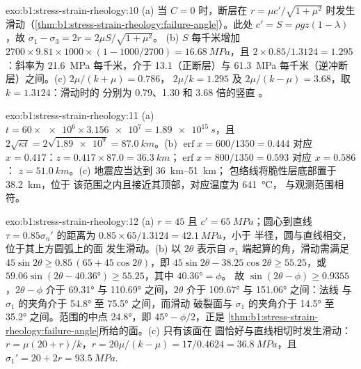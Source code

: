 \begin{solution}{exo:b1:stress-strain-rheology:10}
(a) 当 $C = 0$ 时，断层在 $r = \mu c'/\sqrt{1+\mu^2}$
时发生滑动（\cref{thm:b1:stress-strain-rheology:failure-angle}）。此处 $c' = S =
\rho g z(1-\lambda)$，故 $\sigma_1 - \sigma_3 = 2r = 2\mu S/\sqrt{1+\mu^2}$。
(b) $S$ 每千米增加 $2700\times9.81\times1000\times(1 - 1000/2700) =
\qty{16.68}{MPa}$，且 $2\times0.85/1.3124 = 1.295$：斜率为
\qty{21.6}{MPa} 每千米，介于 \num{13.1}（正断层）与
\qty{61.3}{MPa} 每千米（逆冲断层）之间。(c) $2\mu/(k+\mu) = 0.786$，
$2\mu/k = 1.295$ 及 $2\mu/(k-\mu) = 3.68$，取 $k = 1.3124$：滑动时的
分别为 0.79、1.30 和 3.68 倍的竖直
。
\end{solution}

\begin{solution}{exo:b1:stress-strain-rheology:11}
(a) $t = 60\times\num{e6}\times\num{3.156e7} = \qty{1.89e15}{s}$，且
$2\sqrt{\kappa t} = 2\sqrt{\num{1.89e9}} = \qty{87.0}{km}$。(b)
$\operatorname{erf}x = 600/1350 = 0.444$ 对应 $x = 0.417$：$z = 0.417\times87.0
= \qty{36.3}{km}$；$\operatorname{erf}x = 800/1350 = 0.593$ 对应 $x = 0.586$：
$z = \qty{51.0}{km}$。(c) 地震应当达到 \qtyrange{36}{51}{km}；
包络线将脆性层底部置于 \qty{38.2}{km}，位于
该范围之内且接近其顶部，对应温度为 \qty{641}{\degreeCelsius}，
与观测范围相符。
\end{solution}

\begin{solution}{exo:b1:stress-strain-rheology:12}
(a) $r = 45$ 且 $c' = \qty{65}{MPa}$；圆心到直线
$\tau = 0.85\sigma_n'$ 的距离为 $0.85\times65/1.3124 = \qty{42.1}{MPa}$，小于
半径，圆与直线相交，位于其上方圆弧上的面
发生滑动。(b) 以 $2\theta$ 表示自 $\sigma_1$ 端起算的角，滑动需满足
$45\sin2\theta \ge 0.85\,(65 + 45\cos2\theta)$，即
$45\sin2\theta - 38.25\cos2\theta \ge 55.25$，或
$59.06\sin(2\theta - \ang{40.36}) \ge 55.25$，其中 $\ang{40.36} = \phi$。
故 $\sin(2\theta - \phi) \ge 0.9355$，$2\theta - \phi$ 介于 \ang{69.31}
与 \ang{110.69} 之间，$2\theta$ 介于 \ang{109.67} 与 \ang{151.06} 之间：法线
与 $\sigma_1$ 的夹角介于 \ang{54.8} 至 \ang{75.5} 之间，而滑动
破裂面与 $\sigma_1$ 的夹角介于 \ang{14.5} 至 \ang{35.2} 之间。范围的中点
\ang{24.8}，即 $\ang{45} - \phi/2$，正是
\cref{thm:b1:stress-strain-rheology:failure-angle}所给的面。(c) 只有该面在
圆恰好与直线相切时发生滑动：$r = \mu(20 + r)/k$，$r = 20\mu/(k -
\mu) = 17/0.4624 = \qty{36.8}{MPa}$，且 $\sigma_1' = 20 + 2r =
\qty{93.5}{MPa}$.
\end{solution}

